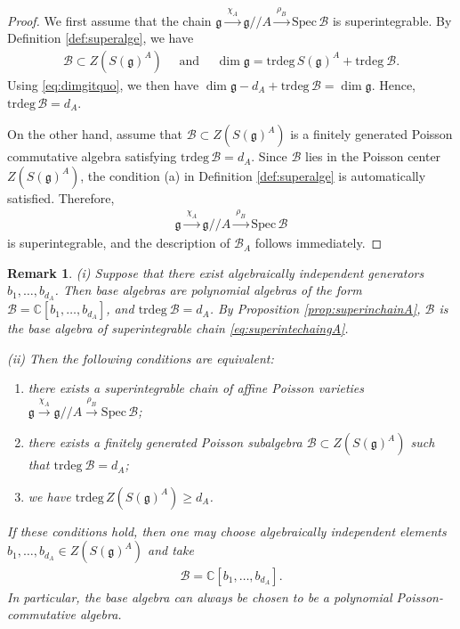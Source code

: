 \documentclass[11pt,reqno]{amsart}
\newtheorem*{theorem A}{Main Theorem A}
\newtheorem*{theorem B}{Main Theorem B}
\newtheorem*{theorem C}{Main Theorem C}
\newtheorem*{theorem D}{Main Theorem D}
\theoremstyle{definition}
\theoremstyle{plain}
\newtheorem{remark}[theorem]{Remark}
\theoremstyle{conclusion}
\begin{document}
\begin{proof}
We first assume that the chain $ \mathfrak{g} \xrightarrow{ \ \chi_A \ } \mathfrak{g}//A \xrightarrow{ \ \rho_B \ } \mathrm{Spec}\, \mathcal{B}$ is superintegrable. By Definition \ref{def:superalge}, we have \begin{align*}
    \mathcal{B} \subset Z(S(\mathfrak{g})^A) \quad \text{ and } \quad \dim \mathfrak{g} = \mathrm{trdeg} \, S(\mathfrak{g})^A + \mathrm{trdeg} \ \mathcal{B} .
\end{align*} Using \eqref{eq:dimgitquo}, we then have $\dim \mathfrak{g} - d_A + \mathrm{trdeg}\, \mathcal{B} = \dim \mathfrak{g}$. Hence, $\mathrm{trdeg}\, \mathcal{B} = d_A$.

On the other hand, assume that $\mathcal{B} \subset Z(S(\mathfrak{g})^A)$ is a finitely generated Poisson commutative algebra satisfying $\mathrm{trdeg} \, \mathcal{B} = d_A$. Since $\mathcal{B}$ lies in the Poisson center $Z(S(\mathfrak{g})^A)$, the condition (a) in Definition \ref{def:superalge} is automatically satisfied. Therefore, \begin{align*}
    \mathfrak{g} \xrightarrow{ \ \chi_A \ } \mathfrak{g}//A \xrightarrow{ \ \rho_B \ } \mathrm{Spec}\, \mathcal{B}
\end{align*} is superintegrable, and the description of $\mathcal{B}_A$ follows immediately.
\end{proof}
\begin{remark}
    \label{rem:polybaseA}
(i) Suppose that there exist algebraically independent generators $b_1,\ldots,b_{d_A}$. Then base algebras are polynomial algebras of the form $\mathcal{B} = \mathbb{C}[b_1,\ldots,b_{d_A}]$, and $\mathrm{trdeg} \ \mathcal{B}  = d_A$. By Proposition \ref{prop:superinchainA}, $\mathcal{B}$ is the base algebra of superintegrable chain \eqref{eq:superintechaingA}.

(ii) Then the following conditions are equivalent:
\begin{enumerate}
\item there exists a superintegrable chain of affine Poisson varieties $\mathfrak{g} \xrightarrow{\chi_A} \mathfrak{g}//A \xrightarrow{\rho_B} \mathrm{Spec}\,\mathcal{B}$;
\item there exists a finitely generated Poisson subalgebra $ \mathcal{B}\subset Z(S(\mathfrak{g})^A)$ such that $\mathrm{trdeg} \ \mathcal{B}  = d_A$; 
\item we have  $\mathrm{trdeg}\, Z(S(\mathfrak{g})^A) \geq d_A$. 
\end{enumerate}
If these conditions hold, then one may choose algebraically independent elements $b_1, \dots, b_{d_A} \in Z(S(\mathfrak{g})^A)$ and take \begin{align*}
\mathcal{B} = \mathbb{C}[b_1,\dots,b_{d_A}].
\end{align*}
In particular, the base algebra can always be chosen to be a polynomial Poisson-commutative algebra.
\end{remark}
\end{document}

